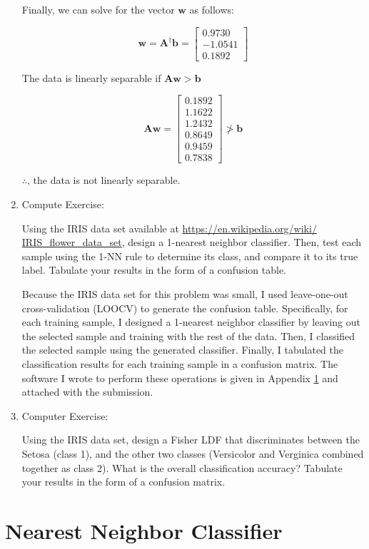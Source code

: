 \documentclass[fleqn]{article}
\begin{document}
\begin{enumerate}
		Finally, we can solve for the vector $\mathbf{w}$ as follows:
		
		\begin{equation*}
			\mathbf{w} = \mathbf{A}^{\dag}\mathbf{b} = \begin{bmatrix} 0.9730 \\ -1.0541 \\ 0.1892 \end{bmatrix}
		\end{equation*}
		
		The data is linearly separable if $\mathbf{A}\mathbf{w} > \mathbf{b}$
		
		\begin{equation*}
			\mathbf{A}\mathbf{w} = \begin{bmatrix}
				0.1892 \\
    				1.1622 \\
   	 			1.2432 \\
    				0.8649 \\
    				0.9459 \\
    				0.7838
			\end{bmatrix} \ngtr \mathbf{b}
		\end{equation*}
		
		$\therefore$, the data is not linearly separable.
		
		\item Compute Exercise:
		
		Using the IRIS data set available at \href{https://en.wikipedia.org/wiki/IRIS_flower_data_set}{https://en.wikipedia.org/wiki/\\IRIS\_flower\_data\_set}, design a 1-nearest neighbor classifier. Then, test each sample using the 1-NN rule to determine its class, and compare it to its true label. Tabulate your results in the form of a confusion table.
		
		Because the IRIS data set for this problem was small, I used leave-one-out cross-validation (LOOCV) to generate the confusion table. Specifically, for each training sample, I designed a 1-nearest neighbor classifier by leaving out the selected sample and training with the rest of the data. Then, I classified the selected sample using the generated classifier. Finally, I tabulated the classification results for each training sample in a confusion matrix. The software I wrote to perform these operations is given in Appendix \ref{nearest_neighbor} and attached with the submission.
		
		\item Computer Exercise:
		
		Using the IRIS data set, design a Fisher LDF that discriminates between the Setosa (class 1), and the other two classes (Versicolor and Verginica combined together as class 2). What is the overall classification accuracy? Tabulate your results in the form of a confusion matrix.
		
	\end{enumerate}
	
	\pagebreak
	\appendix
	\section{Nearest Neighbor Classifier}
	\label{nearest_neighbor}
	\lstset{style=Matlab-editor,basicstyle=\ttfamily\footnotesize}
	
	\raggedbottom
\end{document}
